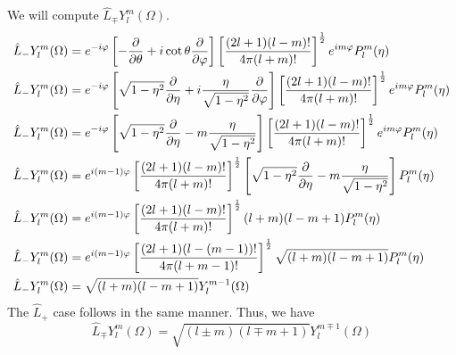 \documentclass[]{book}
\begin{document}
\begin{enumerate}[1)]
\begin{enumerate}[(i)]
\begin{equation}
\end{equation}
We will compute $\hat{L}_{\mp}Y_l^m(\Omega)$.
\begin{equation}
\begin{split}
\hat{L}_{-}Y_l^m(\Omega) & = e^{ - i\varphi} \left[ -\pdv{\theta} + i \cot\theta\pdv{\varphi}\right]\left[\frac{(2l+1)(l-m)!}{4\pi(l+m)!} \right]^\frac{1}{2}e^{im\varphi}P_l^m(\eta) \\
\hat{L}_{-}Y_l^m(\Omega) & =   e^{ - i\varphi}\left[ \sqrt{1-\eta^2}\pdv{\eta} + i \frac{\eta}{\sqrt{1-\eta^2}}\pdv{\varphi}\right]\left[\frac{(2l+1)(l-m)!}{4\pi(l+m)!} \right]^\frac{1}{2}e^{im\varphi}P_l^m(\eta) \\
\hat{L}_{-}Y_l^m(\Omega) & =  e^{ - i\varphi} \left[ \sqrt{1-\eta^2}\pdv{\eta} - m \frac{\eta}{\sqrt{1-\eta^2}}\right]\left[\frac{(2l+1)(l-m)!}{4\pi(l+m)!} \right]^\frac{1}{2}e^{im\varphi}P_l^m(\eta) \\
\hat{L}_{-}Y_l^m(\Omega) & =  e^{  i(m-1)\varphi} \left[\frac{(2l+1)(l-m)!}{4\pi(l+m)!} \right]^\frac{1}{2}\left[ \sqrt{1-\eta^2}\pdv{\eta} - m \frac{\eta}{\sqrt{1-\eta^2}}\right]P_l^m(\eta) \\
\hat{L}_{-}Y_l^m(\Omega) & =  e^{  i(m-1)\varphi} \left[\frac{(2l+1)(l-m)!}{4\pi(l+m)!} \right]^\frac{1}{2}(l+m)(l-m+1)P_l^m(\eta) \\
\hat{L}_{-}Y_l^m(\Omega) & =  e^{  i(m-1)\varphi} \left[\frac{(2l+1)(l-(m-1))!}{4\pi(l+m-1)!} \right]^\frac{1}{2}\sqrt{(l+m)(l-m+1)}P_l^m(\eta) \\
\hat{L}_{-}Y_l^m(\Omega) & =  \sqrt{(l+m)(l-m+1)}Y_l^{m-1}(\Omega) \\
\end{split}
\end{equation}
The $\hat{L}_+$ case follows in the same manner. Thus, we have
\begin{equation}
\hat{L}_{\mp}Y_l^m(\Omega) =  \sqrt{(l\pm m)(l\mp m+1)}Y_l^{m\mp 1}(\Omega) 
\end{equation}


\end{enumerate}
\end{enumerate}
\end{document}
